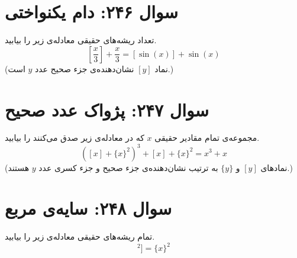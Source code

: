 \documentclass[12pt]{article}
\begin{document}
\vspace{1cm}
\hrulefill
\vspace{1cm}

\section*{سوال ۲۴۶: دام یکنواختی}
تعداد ریشه‌های حقیقی معادله‌ی زیر را بیابید.
\begin{displaymath}
	\left[\frac{x}{3}\right] + \frac{x}{3} = [\sin(x)] + \sin(x)
\end{displaymath}
(نماد \( [y] \) نشان‌دهنده‌ی جزء صحیح عدد \(y\) است.)

\vspace{1cm}
\hrulefill
\vspace{1cm}

\section*{سوال ۲۴۷: پژواک عدد صحیح}
مجموعه‌ی تمام مقادیر حقیقی \(x\) که در معادله‌ی زیر صدق می‌کنند را بیابید.
\begin{displaymath}
	([x] + \{x\}^2)^3 + [x] + \{x\}^2 = x^3 + x
\end{displaymath}
(نمادهای \( [y] \) و \( \{y\} \) به ترتیب نشان‌دهنده‌ی جزء صحیح و جزء کسری عدد \(y\) هستند.)

\vspace{1cm}
\hrulefill
\vspace{1cm}

\section*{سوال ۲۴۸: سایه‌ی مربع}
تمام ریشه‌های حقیقی معادله‌ی زیر را بیابید.
\begin{displaymath}
	[x^2 - [x]^2] = \{x\}^2
\end{displaymath}

\vspace{1cm}
\hrulefill
\vspace{1cm}
\end{document}
